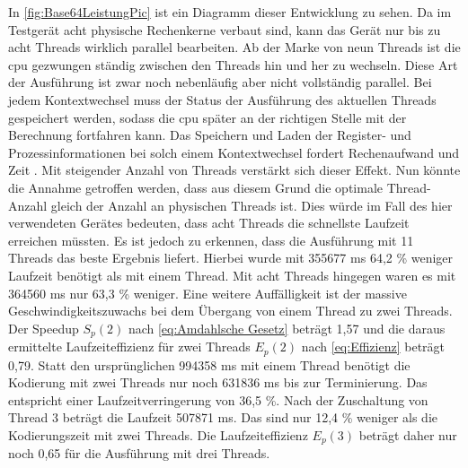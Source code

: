 In \autoref{fig:Base64LeistungPic} ist ein Diagramm dieser Entwicklung zu sehen. Da im Testgerät acht physische Rechenkerne verbaut sind, kann das Gerät nur bis zu acht Threads wirklich parallel bearbeiten. Ab der Marke von neun Threads ist die \ac{cpu} gezwungen ständig zwischen den Threads hin und her zu wechseln. Diese Art der Ausführung ist zwar noch nebenläufig aber nicht vollständig parallel. Bei jedem Kontextwechsel muss der Status der Ausführung des aktuellen Threads gespeichert werden, sodass die \ac{cpu} später an der richtigen Stelle mit der Berechnung fortfahren kann. Das Speichern und Laden der Register- und Prozessinformationen bei solch einem Kontextwechsel fordert Rechenaufwand und Zeit \cite[2]{MultiThreadingThesis}. Mit steigender Anzahl von Threads verstärkt sich dieser Effekt. Nun könnte die Annahme getroffen werden, dass aus diesem Grund die optimale Thread-Anzahl gleich der Anzahl an physischen Threads ist. Dies würde im Fall des hier verwendeten Gerätes bedeuten, dass acht Threads die schnellste Laufzeit erreichen müssten. Es ist jedoch zu erkennen, dass die Ausführung mit 11 Threads das beste Ergebnis liefert. Hierbei wurde mit 355677 \ac{ms} 64,2 \% weniger Laufzeit benötigt als mit einem Thread. Mit acht Threads hingegen waren es mit 364560 \ac{ms} nur 63,3 \% weniger. Eine weitere Auffälligkeit ist der massive Geschwindigkeitszuwachs bei dem Übergang von einem Thread zu zwei Threads. Der Speedup $S_{p}(2)$ nach \autoref{eq:Amdahlsche Gesetz} beträgt 1,57 und die daraus ermittelte Laufzeiteffizienz für zwei Threads $E_{ p }(2)$ nach \autoref{eq:Effizienz} beträgt 0,79. Statt den ursprünglichen 994358 \ac{ms} mit einem Thread benötigt die Kodierung mit zwei Threads nur noch 631836 \ac{ms} bis zur Terminierung. Das entspricht einer Laufzeitverringerung von  36,5 \%. Nach der Zuschaltung von Thread 3 beträgt die Laufzeit 507871 \ac{ms}. Das sind nur 12,4 \% weniger als  die Kodierungszeit mit zwei Threads. Die Laufzeiteffizienz $E_{ p }(3)$ beträgt daher nur noch 0,65 für die Ausführung mit drei Threads. 


